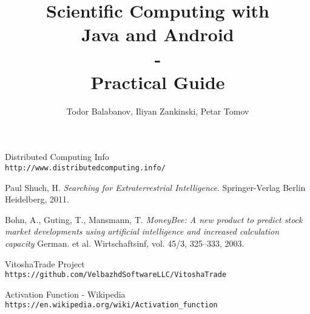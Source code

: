 \documentclass[book,a5paper,12pt,twoside,openany]{memoir}
\title{Scientific Computing with\\Java and Android\\-\\Practical Guide}
\author{Todor Balabanov, Iliyan Zankinski, Petar Tomov}
\begin{document}
\maketitle

\thispagestyle{empty}




\newpage
{}

\newpage
\tableofcontents

\renewcommand\thesection{\thechapter.\arabic{section}}
\renewcommand\thesubsection{\thesection.\arabic{subsection}}











\newpage
\begin{thebibliography}{99}

 Distributed Computing Info \\\texttt{http://www.distributedcomputing.info/}

 Paul Shuch, H. \textit{Searching for Extraterrestrial Intelligence}. Springer-Verlag Berlin Heidelberg, 2011.

 Bohn, A., Guting, T., Mansmann, T. \textit{MoneyBee: A new product to predict stock market developments using artificial intelligence and increased calculation capacity} German. et al. Wirtschaftsinf, vol. 45/3, 325--333, 2003.

 VitoshaTrade Project \\\texttt{https://github.com/VelbazhdSoftwareLLC/VitoshaTrade}

 Activation Function - Wikipedia \\\texttt{https://en.wikipedia.org/wiki/Activation\_function}
\end{thebibliography}

\newpage
\listoffigures


\newpage
\printindex
\end{document}
